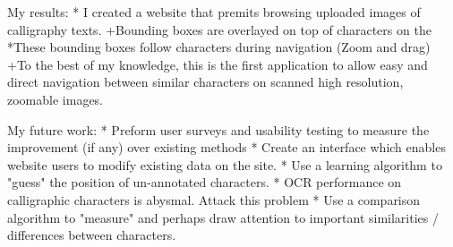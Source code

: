     My results:
        *  I created a website that premits browsing uploaded images of calligraphy texts.
            +Bounding boxes are overlayed on top of characters on the 
                *These bounding boxes follow characters during navigation (Zoom and drag)
            +To the best of my knowledge, this is the first application to allow easy and direct navigation between similar characters on scanned high resolution, zoomable images.


    My future work:
        *  Preform user surveys and usability testing to measure the improvement (if any) over existing methods
        *  Create an interface which enables website users to modify existing data on the site.
        *  Use a learning algorithm to "guess" the position of un-annotated characters.
        *  OCR performance on calligraphic characters is abysmal.  Attack this problem
        *  Use a comparison algorithm to "measure" and perhaps draw attention to important similarities / differences between characters.





